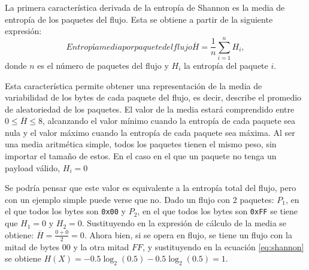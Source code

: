 La primera característica derivada de la entropía de Shannon es la media de entropía de los paquetes del flujo. Esta se obtiene a partir de la siguiente expresión:
\begin{equation}[eq:entropia-media-paquete-flujo]{Entropía media por paquete del flujo}
\overline{H} = \frac{1}{n}\sum_{i=1}^{n} H_i,
\end{equation}donde $n$ es el número de paquetes del flujo y $H_i$ la entropía del paquete $i$.

Esta característica permite obtener una representación de la media de variabilidad de los bytes de cada paquete del flujo, es decir, describe el promedio de aleatoriedad de los paquetes. El valor de la media estará comprendido entre $0 \leq \overline{H} \leq 8$, alcanzando el valor mínimo cuando la entropía de cada paquete sea nula y el valor máximo cuando la entropía de cada paquete sea máxima. Al ser una media aritmética simple, todos los paquetes tienen el mismo peso, sin importar el tamaño de estos. En el caso en el que un paquete no tenga un payload válido, $H_i = 0$

Se podría pensar que este valor es equivalente a la entropía total del flujo, pero con un ejemplo simple puede verse que no. Dado un flujo con 2 paquetes: $P_1$, en el que todos los bytes son \texttt{0x00} y $P_2$, en el que todos los bytes son \texttt{0xFF} se tiene que $H_1 = 0$ y $H_2 = 0$. Sustituyendo en la expresión de cálculo de la media se obtiene: $\overline{H} = \frac{0 + 0}{2} = 0$. Ahora bien, si se opera en flujo, se tiene un flujo con la mitad de bytes $00$ y la otra mitad $FF$, y sustituyendo en la ecuación \eqref{eq:shannon} se obtiene $H(X) = -0.5 \log_{2}(0.5) - 0.5 \log_{2}(0.5) = 1$.


